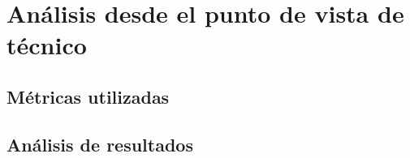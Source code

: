 \section{Análisis desde el punto de vista de técnico}
\label{section:analisis-tecnico}

\tinylipsum

\subsection{Métricas utilizadas}
\tinylipsum

\subsection{Análisis de resultados}
\tinylipsum
